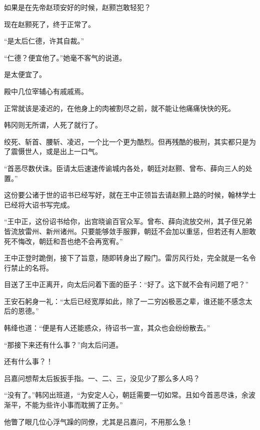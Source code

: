 如果是在先帝赵顼安好的时候，赵颢岂敢轻犯？

现在赵颢死了，终于正常了。

“是太后仁德，许其自裁。”

“仁德？便宜他了。”她毫不客气的说道。

是太便宜了。

殿中几位宰辅心有戚戚焉。

正常就该是凌迟的，在他身上的肉被割尽之前，就不能让他痛痛快快的死。

韩冈则无所谓，人死了就行了。

绞死、斩首、腰斩、凌迟，一个比一个更为酷烈。但再残酷的极刑，其实都只是为了震慑世人，或是出上一口气。

“首恶尽数伏诛。臣请太后速速传谕城内各处，朝廷对赵颢、曾布、薛向三人的处置。”

这份要公诸于世的诏书已经写好，就在王中正领旨去请赵颢上路的时候，翰林学士已经将大诏书写完成。

“王中正，这份诏书给你，出宫晓谕百官众军。曾布、薛向流放交州，其子侄兄弟皆流放雷州、新州诸州。只要能够敛手服罪，朝廷不会加以重惩，但若还有人胆敢死不悔改，朝廷和吾也绝不会再宽宥。”

王中正登时跪倒，接下了旨意，随即转身出了殿门。雷厉风行处，完全就是一名令行禁止的名将。

目送了王中正离开，向太后问着下面的臣子：“好了。这下就不会有问题了吧？”

王安石躬身一礼：“太后已经宽厚如此，除了一二穷凶极恶之辈，谁还能不感念太后的恩德。”

韩绛也道：“便是有人还能惑众，待诏书一宣，其众也会纷纷散去。”

“那接下来还有什么事？”向太后问道。

还有什么事？！

吕嘉问想帮太后扳扳手指。一、二、三，没见少了那么多人吗？

“没有了。”韩冈出班道，“为安定人心，朝廷需要一切如常。且如今首恶尽诛，余波渐平，不能为些许小事而耽搁了正务。”

他瞥了眼几位心浮气躁的同僚，尤其是吕嘉问，不用那么急！

